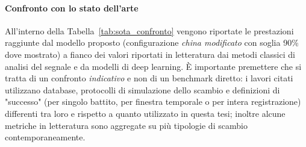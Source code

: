 \paragraph{Confronto con lo stato dell'arte}
All'interno della Tabella~\ref{tab:sota_confronto} vengono riportate le prestazioni raggiunte dal modello proposto (configurazione \emph{china modificato} con soglia 90\% dove mostrato) a fianco dei valori riportati in letteratura dai metodi classici di analisi del segnale e da modelli di deep learning. È importante premettere che si tratta di un confronto \emph{indicativo} e non di un benchmark diretto: i lavori citati utilizzano database, protocolli di simulazione dello scambio e definizioni di "successo" (per singolo battito, per finestra temporale o per intera registrazione) differenti tra loro e rispetto a quanto utilizzato in questa tesi; inoltre alcune metriche in letteratura sono aggregate su più tipologie di scambio contemporaneamente.

